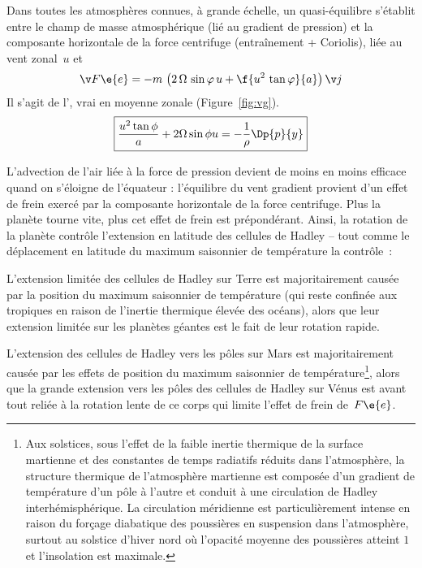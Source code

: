 \sk
Dans toutes les atmosphères connues, à grande échelle, un quasi-équilibre s'établit entre le champ de masse atmosphérique (lié au gradient de pression) et la composante horizontale de la force centrifuge (entraînement + Coriolis), liée au vent zonal~$u$ et 
\[
\v F\e{e} = - m \, \left( 2\,\Omega\,\sin\varphi\,u + \f{u^2\,\tan\varphi}{a} \right) \v j
\]
\noindent Il s'agit de l', vrai en moyenne zonale (Figure~\ref{fig:vg}). 
\[
\boxed{\dfrac{u^2\tan\phi}{a} + 2\Omega\sin\phi u = -\dfrac{1}{\rho}\Dp{p}{y}}
\]


\sk
L'advection de l'air liée à la force de pression devient de moins en moins efficace quand on s'éloigne de l'équateur : l'équilibre du vent gradient provient d'un effet de frein exercé par la composante horizontale de la force centrifuge. Plus la planète tourne vite, plus cet effet de frein est prépondérant. Ainsi, la rotation de la planète contrôle l'extension en latitude des cellules de Hadley -- tout comme le déplacement en latitude du maximum saisonnier de température la contrôle~: 
\begin{finger}
\item L'extension limitée des cellules de Hadley sur Terre est majoritairement causée par la position du maximum saisonnier de température (qui reste confinée aux tropiques en raison de l'inertie thermique élevée des océans), alors que leur extension limitée sur les planètes géantes est le fait de leur rotation rapide.
\item L'extension des cellules de Hadley vers les pôles sur Mars est majoritairement causée par les effets de position du maximum saisonnier de température\footnote{Aux solstices, sous l'effet de la faible inertie thermique de la surface martienne et des constantes de temps radiatifs réduits dans l'atmosphère, la structure thermique de l'atmosphère martienne est composée d'un gradient de température d'un pôle à l'autre et conduit à une circulation de Hadley interhémisphérique. La circulation méridienne est particulièrement intense en raison du forçage diabatique des poussières en suspension dans l'atmosphère, surtout au solstice d'hiver nord où l'opacité moyenne des poussières atteint $1$ et l'insolation est maximale.}, alors que la grande extension vers les pôles des cellules de Hadley sur Vénus est avant tout reliée à la rotation lente de ce corps qui limite l'effet de frein de~$F\e{e}$.
\end{finger}

